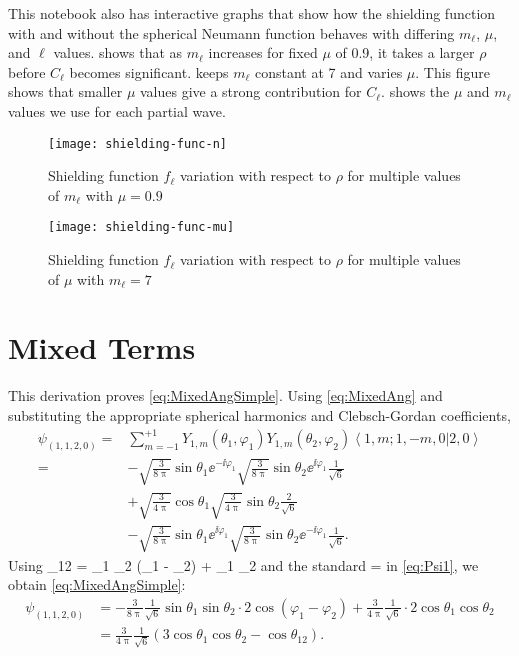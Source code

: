 \documentclass[Dissertation.tex]{subfiles}
\begin{document}
This notebook also has interactive graphs that show how the shielding function
with and without the spherical Neumann function behaves with differing $m_\ell$,
$\mu$, and $\ell$ values.  shows that as $m_\ell$
increases for fixed $\mu$ of 0.9, it takes a larger $\rho$ before $C_\ell$
becomes significant.  keeps $m_\ell$ constant at 7
and varies $\mu$. This figure shows that smaller $\mu$ values give a strong
contribution for $C_\ell$.  shows the $\mu$ and $m_\ell$
values we use for each partial wave.
\begin{figure}
	\centering
	\texttt{[image: shielding-func-n]}
	\caption{Shielding function $f_\ell$ variation with respect to $\rho$ for multiple values of $m_\ell$ with $\mu = 0.9$}
	\label{fig:shielding-func-n}
\end{figure}
\begin{figure}
	\centering
	\texttt{[image: shielding-func-mu]}
	\caption{Shielding function $f_\ell$ variation with respect to $\rho$ for multiple values of $\mu$ with $m_\ell = 7$}
	\label{fig:shielding-func-mu}
\end{figure}


\section{Mixed Terms}
\label{sec:MixedDerivation}

This derivation proves \cref{eq:MixedAngSimple}. Using \cref{eq:MixedAng} and
substituting the appropriate spherical harmonics and Clebsch-Gordan coefficients,
\begin{align}
\label{eq:Psi1}
\psi_{(1,1,2,0)} = &\sum_{m=-1}^{+1} Y_{1,m}(\theta_1,\varphi_1) Y_{1,m}(\theta_2,\varphi_2) \left< 1,m; 1,-m,0 | 2,0 \right> \nonumber \\
	= &-\sqrt{\frac{3}{8\uppi}} \sin\theta_1 \ee^{-\ii \varphi_1} \sqrt{\frac{3}{8\uppi}} \sin\theta_2 \ee^{\ii \varphi_1} \frac{1}{\sqrt{6}} \nonumber \\
	& + \sqrt{\frac{3}{4\uppi}} \cos\theta_1 \sqrt{\frac{3}{4\uppi}} \sin\theta_2 \frac{2}{\sqrt{6}} \nonumber \\
	& -\sqrt{\frac{3}{8\uppi}} \sin\theta_1 \ee^{\ii \varphi_1} \sqrt{\frac{3}{8\uppi}} \sin\theta_2 \ee^{-\ii \varphi_1} \frac{1}{\sqrt{6}}.
\end{align}
Using \cite[p.192]{VanReethThesis}
\beq
\cos\theta_{12} = \sin\theta_1 \sin\theta_2 \cos(\varphi_1 - \varphi_2) + \cos\theta_1 \cos\theta_2
\eeq
and the standard
\beq
\cos\theta = 
\eeq
in \cref{eq:Psi1}, we obtain \cref{eq:MixedAngSimple}:
\begin{align}
\label{eq:Psi2}
\psi_{(1,1,2,0)} &= -\frac{3}{8\uppi} \frac{1}{\sqrt{6}} \sin\theta_1 \sin\theta_2 \cdot 2 \cos(\varphi_1 - \varphi_2) + \frac{3}{4\uppi} \frac{1}{\sqrt{6}} \cdot 2 \cos\theta_1 \cos\theta_2 \nonumber \\
&= \frac{3}{4\uppi} \frac{1}{\sqrt{6}} \left(3 \cos\theta_1 \cos\theta_2 - \cos\theta_{12} \right).
\end{align}
\end{document}
